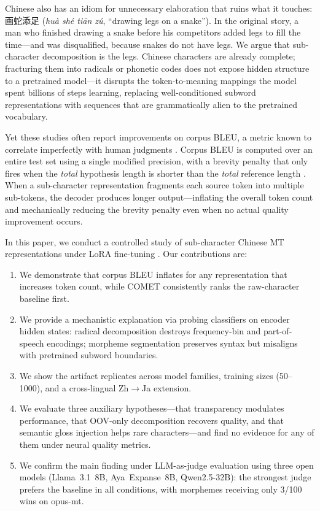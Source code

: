 \documentclass[11pt]{article}
\begin{document}
Chinese also has an idiom for unnecessary elaboration that ruins what it touches: 画蛇添足 (\textit{huà shé tiān zú}, ``drawing legs on a snake''). In the original story, a man who finished drawing a snake before his competitors added legs to fill the time---and was disqualified, because snakes do not have legs. We argue that sub-character decomposition is the legs. Chinese characters are already complete; fracturing them into radicals or phonetic codes does not expose hidden structure to a pretrained model---it disrupts the token-to-meaning mappings the model spent billions of steps learning, replacing well-conditioned subword representations with sequences that are grammatically alien to the pretrained vocabulary.

Yet these studies often report improvements on corpus BLEU, a metric known to correlate imperfectly with human judgments \citep{callison-burch-etal-2006-reevaluation,freitag-etal-2022-results}. Corpus BLEU is computed over an entire test set using a single modified precision, with a brevity penalty that only fires when the \textit{total} hypothesis length is shorter than the \textit{total} reference length \citep{papineni-etal-2002-bleu}. When a sub-character representation fragments each source token into multiple sub-tokens, the decoder produces longer output---inflating the overall token count and mechanically reducing the brevity penalty even when no actual quality improvement occurs.

In this paper, we conduct a controlled study of sub-character Chinese MT representations under LoRA fine-tuning \citep{hu-etal-2022-lora}. Our contributions are:

\begin{enumerate}
\item We demonstrate that corpus BLEU inflates for any representation that increases token count, while COMET \citep{rei-etal-2022-comet} consistently ranks the raw-character baseline first.
\item We provide a mechanistic explanation via probing classifiers on encoder hidden states: radical decomposition destroys frequency-bin and part-of-speech encodings; morpheme segmentation preserves syntax but misaligns with pretrained subword boundaries.
\item We show the artifact replicates across model families, training sizes (50--1000), and a cross-lingual Zh$\to$Ja extension.
\item We evaluate three auxiliary hypotheses---that transparency modulates performance, that OOV-only decomposition recovers quality, and that semantic gloss injection helps rare characters---and find no evidence for any of them under neural quality metrics.
\item We confirm the main finding under LLM-as-judge evaluation \citep{dubey-etal-2024-llama3,ustun-etal-2024-aya,qwen-team-2025-qwen25} using three open models (Llama~3.1~8B, Aya~Expanse~8B, Qwen2.5-32B): the strongest judge prefers the baseline in all conditions, with morphemes receiving only 3/100 wins on opus-mt.
\end{enumerate}
\end{document}
